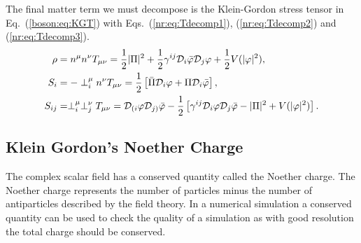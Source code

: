 The final matter term we must decompose is the Klein-Gordon stress tensor in Eq.~(\ref{boson:eq:KGT}) with Eqs.~(\ref{nr:eq:Tdecomp1}), (\ref{nr:eq:Tdecomp2}) and (\ref{nr:eq:Tdecomp3}). \begin{align} \rho &=n^\mu n^\nu T_{\mu\nu} = \frac{1}{2}|\Pi|^2 + \frac{1}{2}\gamma^{ij}\mathcal{D}_i \bar{\varphi} \mathcal{D}_j \varphi +\frac{1}{2}V(|\varphi|^2)
,\\ S_i &= -\perp^\mu_i n^\nu T_{\mu\nu} =  \frac{1}{2}\left[\bar{\Pi} \mathcal{D}_i \varphi  +  \Pi\mathcal{D}_i \bar{\varphi} \right]
,\\ S_{ij} &= \perp^\mu_i \perp^\nu_j T_{\mu\nu} = \mathcal{D}_{(i}\varphi\mathcal{D}_{j)}\bar{\varphi} - \frac{1}{2}\left[ \gamma^{ij}\mathcal{D}_i\varphi\mathcal{D}_j\bar{\varphi} - |\Pi|^2 + V(|\varphi|^2)\right].\end{align}

\subsection{Klein Gordon's Noether Charge}
The complex scalar field has a conserved quantity called the Noether charge. The Noether charge represents the number of particles minus the number of antiparticles described by the field theory. In a numerical simulation a conserved quantity can be used to check the quality of a simulation as with good resolution the total charge should be conserved.

